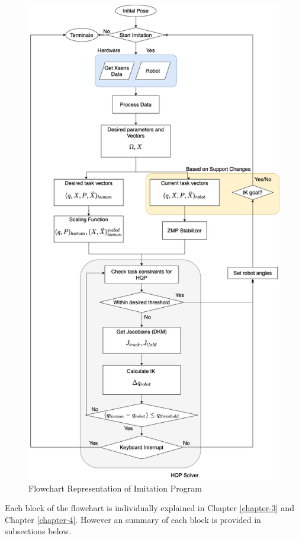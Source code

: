\begin{figure}[h!]
    \centering
    \includegraphics[scale=0.4]{images/flowchart-robot-control.png}\hfill
    \caption{Flowchart Representation of Imitation Program}\hfill
    \label{fig: flowchart-robot-control}
\end{figure}

Each block of the flowchart is individually explained in Chapter \ref{chapter-3} and Chapter \ref{chapter-4}. However an summary of each block is provided
in subsections below.

